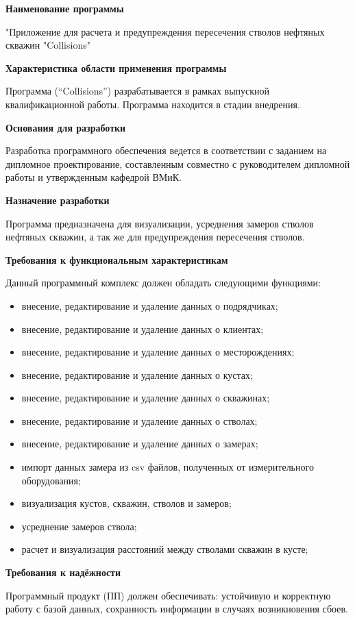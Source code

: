 \textbf{Наименование программы}

"Приложение для расчета и предупреждения пересечения стволов нефтяных скважин "Collisions"

\textbf{Характеристика области применения программы}

Программа (“Collisions”) разрабатывается в рамках выпускной квалификационной работы. Программа находится в стадии внедрения.

\textbf{Основания для разработки}

Разработка программного обеспечения ведется в соответствии с заданием на дипломное проектирование, составленным совместно с
руководителем дипломной работы и утвержденным кафедрой ВМиК.

\textbf{Назначение разработки}

Программа предназначена для визуализации, усреднения замеров стволов нефтяных скважин, а так же для предупреждения пересечения
стволов.

\textbf{Требования к функциональным характеристикам}

Данный программный комплекс должен обладать следующими функциями:
\begin{itemize}
  \item внесение, редактирование и удаление данных о подрядчиках;
  \item внесение, редактирование и удаление данных о клиентах;
  \item внесение, редактирование и удаление данных о месторождениях;
  \item внесение, редактирование и удаление данных о кустах;
  \item внесение, редактирование и удаление данных о скважинах;
  \item внесение, редактирование и удаление данных о стволах;
  \item внесение, редактирование и удаление данных о замерах;
  \item импорт данных замера из csv файлов, полученных от измерительного оборудования;
  \item визуализация кустов, скважин, стволов и замеров;
  \item усреднение замеров ствола;
  \item расчет и визуализация расстояний между стволами скважин в кусте;
\end{itemize}

\textbf{Требования к надёжности}

Программный продукт (ПП) должен обеспечивать: устойчивую и корректную работу с базой данных,
сохранность информации в случаях возникновения сбоев.

